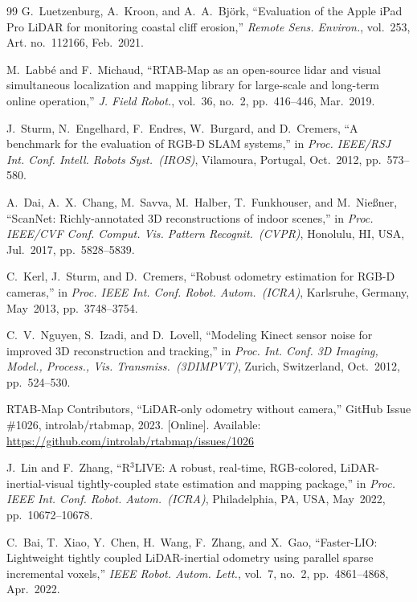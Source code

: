 \begin{thebibliography}{99}
G.~Luetzenburg, A.~Kroon, and A.~A.~Bj\"{o}rk,
``Evaluation of the Apple iPad Pro LiDAR for monitoring coastal cliff erosion,''
\textit{Remote Sens. Environ.}, vol.~253, Art. no.~112166, Feb.~2021.

M.~Labb\'{e} and F.~Michaud,
``RTAB-Map as an open-source lidar and visual simultaneous localization and mapping library for large-scale and long-term online operation,''
\textit{J. Field Robot.}, vol.~36, no.~2, pp.~416--446, Mar.~2019.

J.~Sturm, N.~Engelhard, F.~Endres, W.~Burgard, and D.~Cremers,
``A benchmark for the evaluation of RGB-D SLAM systems,''
in \textit{Proc. IEEE/RSJ Int. Conf. Intell. Robots Syst.\ (IROS)}, Vilamoura, Portugal, Oct.~2012, pp.~573--580.

A.~Dai, A.~X.~Chang, M.~Savva, M.~Halber, T.~Funkhouser, and M.~Nie{\ss}ner,
``ScanNet: Richly-annotated 3D reconstructions of indoor scenes,''
in \textit{Proc. IEEE/CVF Conf. Comput. Vis. Pattern Recognit.\ (CVPR)}, Honolulu, HI, USA, Jul.~2017, pp.~5828--5839.

C.~Kerl, J.~Sturm, and D.~Cremers,
``Robust odometry estimation for RGB-D cameras,''
in \textit{Proc. IEEE Int. Conf. Robot. Autom.\ (ICRA)}, Karlsruhe, Germany, May~2013, pp.~3748--3754.

C.~V.~Nguyen, S.~Izadi, and D.~Lovell,
``Modeling Kinect sensor noise for improved 3D reconstruction and tracking,''
in \textit{Proc. Int. Conf. 3D Imaging, Model., Process., Vis. Transmiss.\ (3DIMPVT)}, Zurich, Switzerland, Oct.~2012, pp.~524--530.

RTAB-Map Contributors,
``LiDAR-only odometry without camera,''
GitHub Issue \#1026, introlab/rtabmap, 2023. [Online]. Available: \url{https://github.com/introlab/rtabmap/issues/1026}

J.~Lin and F.~Zhang,
``R$^3$LIVE: A robust, real-time, RGB-colored, LiDAR-inertial-visual tightly-coupled state estimation and mapping package,''
in \textit{Proc. IEEE Int. Conf. Robot. Autom.\ (ICRA)}, Philadelphia, PA, USA, May~2022, pp.~10672--10678.

C.~Bai, T.~Xiao, Y.~Chen, H.~Wang, F.~Zhang, and X.~Gao,
``Faster-LIO: Lightweight tightly coupled LiDAR-inertial odometry using parallel sparse incremental voxels,''
\textit{IEEE Robot. Autom. Lett.}, vol.~7, no.~2, pp.~4861--4868, Apr.~2022.


\end{thebibliography}

